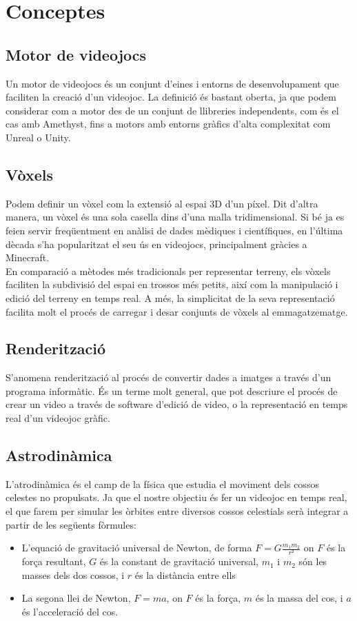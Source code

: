 \section{Conceptes}
\subsection{Motor de videojocs}
Un motor de videojocs és un conjunt d'eines i entorns de desenvolupament que faciliten la creació d'un videojoc. La definició és bastant oberta, ja que podem considerar com a motor des de un conjunt de llibreries independents, com és el cas amb Amethyst, fins a motors amb entorns gràfics d'alta complexitat com Unreal o Unity.

\subsection{Vòxels}
Podem definir un vòxel com la extensió al espai 3D d'un píxel. Dit d'altra manera, un vòxel és una sola casella dins d'una malla tridimensional. Si bé ja es feien servir freqüentment en anàlisi de dades mèdiques i científiques, en l'última dècada s'ha popularitzat el seu ús en videojocs, principalment gràcies a Minecraft.
\\
En comparació a mètodes més tradicionals per representar terreny, els vòxels faciliten la subdivisió del espai en trossos més petits, així com la manipulació i edició del terreny en temps real. A més, la simplicitat de la seva representació facilita molt el procés de carregar i desar conjunts de vòxels al emmagatzematge.
\subsection{Renderització}
S'anomena renderització al procés de convertir dades a imatges a través d'un programa informàtic. És un terme molt general, que pot descriure el procés de crear un video a través de software d'edició de video, o la representació en temps real d'un videojoc gràfic.
\subsection{Astrodinàmica}
L'atrodinàmica és el camp de la física que estudia el moviment dels cossos celestes no propulsats. Ja que el nostre objectiu és fer un videojoc en temps real, el que farem per simular les òrbites entre diversos cossos celestials serà integrar a partir de les següents fòrmules:
\begin{itemize}
  \item L'equació de gravitació universal de Newton, de forma $F=G\frac{m_{1}m_{2}}{r²}$ on $F$ és la força resultant, $G$ és la constant de gravitació universal, $m_{1}$ i $m_{2}$ són les masses dels dos cossos, i $r$ és la distància entre ells
  \item La segona llei de Newton, $F=ma$, on $F$ és la força, $m$ és la massa del cos, i $a$ és l'acceleració del cos.
\end{itemize}
